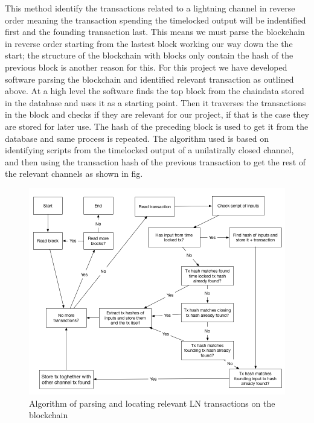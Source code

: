 This method identify the transactions related to a lightning channel in reverse order meaning the transaction spending the timelocked output will be indentified first and the founding transaction last. 
This means we must parse the blockchain in reverse order starting from the lastest block working our way down the the start; the structure of the blockchain with blocks only contain the hash of the previous block is another reason for this.
For this project we have developed software parsing the blockchain and identified relevant transaction as outlined above.
At a high level the software finds the top block from the chaindata stored in the database and uses it as a starting point.
Then it traverses the transactions in the block and checks if they are relevant for our project, if that is the case they are stored for later use. The hash of the preceding block is used to get it from the database and same process is repeated.
The algorithm used is based on identifying scripts from the timelocked output of a unilatirally closed channel, and then using the transaction hash of the previous transaction to get the rest of the relevant channels as shown in fig. 

\begin{figure}[h]
    \centering
    \includegraphics[width=14cm]{figures/algorithm.png}
    \caption{Algorithm of parsing and locating relevant LN transactions on the blockchain}
    \label{fig:htlc_bc}
\end{figure}



